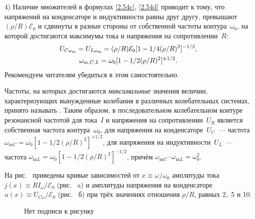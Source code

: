 4) Наличие множителей   в формулах \eqref{2.54c}, \eqref{2.54d} приводит к тому,
что  напряжений на конденсаторе и индуктивности равны друг
другу, превышают $(\rho/R)\mathcal{E}_0$ и сдвинуты в разные стороны от
собственной частоты контура~$\omega_0$, на которой достигаются максимумы тока и
напряжения на сопротивлении~$R$:
\begin{equation}
	\eqmark{2.57}
	\begin{gathered}[c]
U_{C\omega_\text{m}}=U_{L\omega_\text{m}}=(\rho/R)\mathcal{E}_0[1-1/4(\rho/R)^2]
^{-1/2},\\
		\omega_{\text{m},C,L}=\omega_0[1-1/2(\rho/R)^2]^{\pm1/2}.
	\end{gathered}
\end{equation}
Рекомендуем читателям убедиться в этом самостоятельно.

Частоты, на которых достигаются \emph{максимальные} значения величин,
характеризующих вынужденные колебания в различных колебательных системах,
принято называть . Таким образом, в последовательном
колебательном контуре резонансной частотой для тока~$I$ и напряжения на
сопротивлении~$U_R$ является собственная частота контура~$\omega_0$, для
напряжения на конденсаторе~$U_C$~--- частота
$\omega_{\text{m}C}=\omega_0[1-1/2(\rho/R)^2]^{+1/2}$, для напряжения на
индуктивности~$U_L$~--- частота
$\omega_{\text{m}L}=\omega_0[1-1/2(\rho/R)^2]^{-1/2}$, причём
$\omega_{\text{m}C}\cdot\omega_{\text{m}L}=\omega_0^2$.

На рис.~ приведены  кривые
зависимостей от $x\equiv\omega/\omega_0$ амплитуды тока $j(x)\equiv
RI_\omega/\mathcal{E}_0$ (рис.~ a) и амплитуды напряжения на
конденсаторе $u(x)\equiv U_{C\omega}/\mathcal{E}_0$  (рис.~ б) при
трёх значениях отношения $\rho/R$, равных 2,~5 и 10.
\begin{figure}[h]
		\begin{minipage}[h]{0.45\linewidth}
		\end{minipage}
		\hfill
		\begin{minipage}[h]{0.45\linewidth}
		\end{minipage}
		\caption{Нет подписи к рисунку}
\end{figure}

